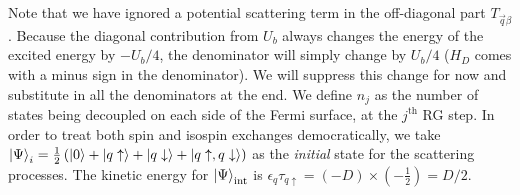 \documentclass[reprint,superscriptaddress,floatfix]{revtex4-2}
\begin{document}
Note that we have ignored a potential scattering term in the off-diagonal part \(T_{\vec q\beta}\). Because the diagonal contribution from \(U_b\) always changes the energy of the excited energy by \(-U_b/4\),  the denominator will simply change by \(U_b/4\) (\(H_D\) comes with a minus sign in the denominator). We will suppress this change for now and substitute in all the denominators at the end. We define \(n_j\) as the number of states being decoupled on each side of the Fermi surface, at the \(j^\text{th}\) RG step. In order to treat both spin and isospin exchanges democratically, we take \(\ket{\Psi}_i = \frac{1}{2}\left(\ket{0} + \ket{q\uparrow} + \ket{q\downarrow} + \ket{q\uparrow, q\downarrow}\right) \) as the \textit{initial} state for the scattering processes. The kinetic energy for \(\ket{\Psi}_\text{int}\) is \(\epsilon_q \tau_{q \uparrow} = \left(-D\right)\times\left(-\frac{1}{2}\right) = D/2\).
\end{document}
